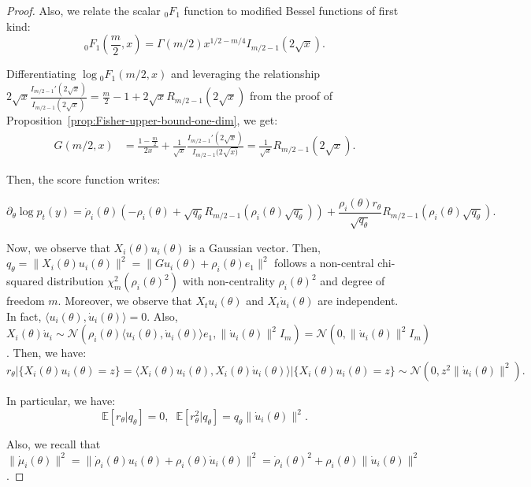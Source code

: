 \documentclass{article}
\theoremstyle{plain}
\theoremstyle{definition}
\theoremstyle{remark}
\begin{document}
\begin{proof}
 Also, we relate the scalar ${}_0F_1$ function to modified Bessel functions of first kind:
\[{}_0F_1\left( \frac{m}{2}, x\right) = \Gamma(m/2)x^{1/2 - m/4} I_{m/2-1}(2\sqrt{x}).\]


Differentiating $\log {}_0F_1(m/2,x)$ and leveraging the relationship $2\sqrt{x}\frac{I_{m/2-1}'(2\sqrt{x})}{I_{m/2-1}(2\sqrt{x})} = \frac{m}{2}-1 + 2\sqrt{x}R_{m/2-1}(2\sqrt{x})$ from the proof of Proposition~\ref{prop:Fisher-upper-bound-one-dim}, we get:
\begin{align*}
    G(m/2,x)  &=  \frac{1-\frac{m}{2}}{2x} + \frac{1}{\sqrt{x}} \frac{I_{m/2-1}'(2\sqrt{x})}{I_{m/2-1}(2\sqrt{x)}} = \frac{1}{\sqrt{x}} R_{m/2-1}(2\sqrt{x}).
\end{align*}

Then, the score function writes:

\[\partial_\theta \log p_t(y) =  \dot \rho_i(\theta) \left(- \rho_i(\theta) +  \sqrt{q_\theta} R_{m/2-1}\left(\rho_i(\theta)\sqrt{q_\theta}\right) \right) + \frac{\rho_i(\theta) r_\theta }{\sqrt{q_\theta}}R_{m/2-1}\left(\rho_i(\theta)\sqrt{q_\theta}\right).\]

Now, we observe that $X_i(\theta) u_i(\theta)$ is a Gaussian vector. Then, $q_\theta = \|X_i(\theta) u_i(\theta)\|^2 = \|G u_i(\theta) + \rho_i(\theta) e_1\|^2$ follows a non-central chi-squared distribution $\chi_m^2(\rho_i(\theta)^2)$ with non-centrality $\rho_i(\theta)^2$ and degree of freedom $m$. Moreover, we observe that $X_tu_i(\theta)$ and $X_t \dot u_i(\theta)$ are independent. In fact, $\langle u_i(\theta), \dot u_i(\theta) \rangle = 0$. Also, $X_i(\theta) \dot u_i \sim \mathcal{N}(\rho_i(\theta) \langle u_i(\theta), \dot u_i(\theta)\rangle e_1, \|\dot u_i(\theta)\|^2 I_m) = \mathcal{N}(0,\|\dot u_i(\theta)\|^2 I_m)$. Then, we have:
\[r_\theta | \{ X_i(\theta) u_i(\theta) = z\} = \langle X_i(\theta)u_i(\theta), X_i(\theta) \dot u_i(\theta) \rangle | \{X_i(\theta) u_i(\theta) = z\} \sim \mathcal{N}(0, z^2\|\dot u_i(\theta)\|^2).\]

In particular, we have:
\[ \mathbb{E}[r_\theta | q_\theta] = 0, \;\; \mathbb{E}[r_\theta^2 | q_\theta ] = q_\theta\|\dot u_i(\theta)\|^2.\]

Also, we recall that $\|\dot \mu_i(\theta)\|^2 = \|\dot \rho_i(\theta) u_i(\theta) + \rho_i(\theta) \dot u_i(\theta)\|^2 = \dot \rho_i(\theta)^2 + \rho_i(\theta) \|\dot u_i(\theta)\|^2$.


\end{proof}
\end{document}
